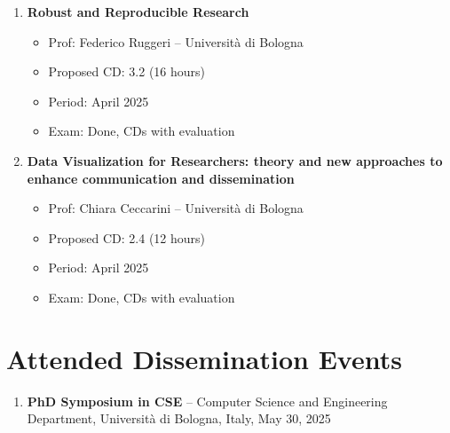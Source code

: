 \documentclass[runningheads]{llncs}
\begin{document}
\begin{enumerate}
\begin{itemize}
        \end{itemize}
        \item \textbf{Robust and Reproducible Research}
        \begin{itemize}
            \item Prof: Federico Ruggeri -- Università di Bologna
            \item Proposed CD: 3.2 (16 hours)
            \item Period: April 2025
            \item Exam: Done, CDs with evaluation
        \end{itemize}
        \item \textbf{Data Visualization for Researchers: theory and new approaches to enhance communication and dissemination}
        \begin{itemize}
            \item Prof: Chiara Ceccarini -- Università di Bologna
            \item Proposed CD: 2.4 (12 hours)
            \item Period: April 2025
            \item Exam: Done, CDs with evaluation
        \end{itemize}

    \end{enumerate}

    \section{Attended Dissemination Events}\label{sec:attended-dissemination-events}
    \begin{enumerate}
        \item \textbf{PhD Symposium in CSE} -- Computer Science and Engineering Department, Università di Bologna, Italy, May 30, 2025
    \end{enumerate}


    
    
\end{document}
